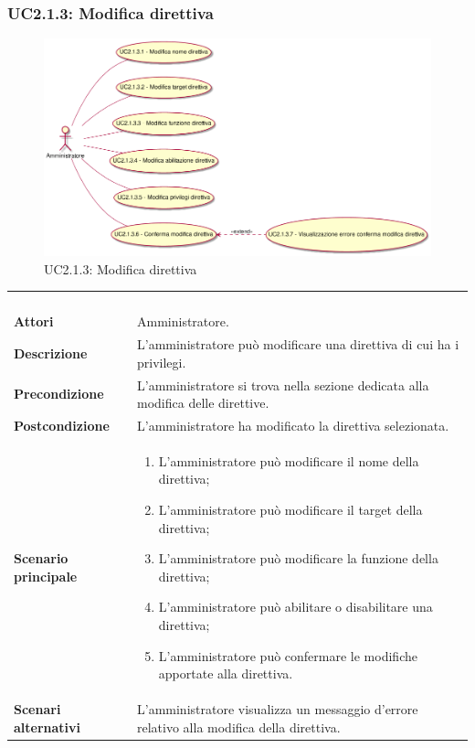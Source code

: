 \newpage\subsubsection{UC2.1.3: Modifica direttiva}
\label{UC2.1.3}
\begin{figure}[h]
\centering
\includegraphics[width=\textwidth,height=\textheight,keepaspectratio]{images/UseCaseUC213.png}
\caption{UC2.1.3: Modifica direttiva}
\end{figure}
\begin{longtable}{l|p{10cm}}
\rowcolor[gray]{0.8} \multicolumn{2}{c}{} \\
\rowcolor[gray]{0.8} \multicolumn{2}{c}{\textbf{UC2.1.3 - Modifica direttiva}} \\
\rowcolor[gray]{0.8} \multicolumn{2}{c}{} \\
\hline
&\\
\textbf{Attori} & Amministratore.\\[7pt]
\textbf{Descrizione} & L'amministratore può modificare una direttiva di cui ha i privilegi. \\[7pt]
\textbf{Precondizione} & L'amministratore si trova nella sezione dedicata alla modifica delle direttive.\\[7pt]
\textbf{Postcondizione} & L'amministratore ha modificato la direttiva selezionata.\\[7pt]
\textbf{Scenario principale} &\begin{enumerate}
\item  L'amministratore può modificare il nome della direttiva;
\item  L'amministratore può modificare il target della direttiva;
\item  L'amministratore può modificare la funzione della direttiva;
\item  L'amministratore può abilitare o disabilitare una direttiva;
\item  L'amministratore può confermare le modifiche apportate alla direttiva.
\end{enumerate}
\\[7pt]
\textbf{Scenari alternativi} & L'amministratore visualizza un messaggio d'errore relativo alla modifica della direttiva.\\[7pt]\hline
\end{longtable}

